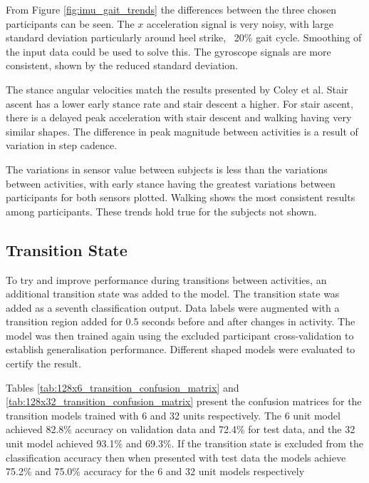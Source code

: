\documentclass[sensors,article,submit,moreauthors,pdftex]{Definitions/mdpi}
\begin{document}
From Figure \ref{fig:imu_gait_trends} the differences between the three chosen participants can be seen. The $x$ acceleration signal is very noisy, with large standard deviation particularly around heel strike, ~20\% gait cycle. Smoothing of the input data could be used to solve this. The gyroscope signals are more consistent, shown by the reduced standard deviation.

The stance angular velocities match the results presented by Coley et al. Stair ascent has a lower early stance rate and stair descent a higher. For stair ascent, there is a delayed peak acceleration with stair descent and walking having very similar shapes. The difference in peak magnitude between activities is a result of variation in step cadence.

The variations in sensor value between subjects is less than the variations between activities, with early stance having the greatest variations between participants for both sensors plotted. Walking shows the most consistent results among participants. These trends hold true for the subjects not shown.


\subsection{Transition State}
To try and improve performance during transitions between activities, an additional transition state was added to the model. The transition state was added as a seventh classification output. Data labels were augmented with a transition region added for 0.5 seconds before and after changes in activity. The model was then trained again using the excluded participant cross-validation to establish generalisation performance. Different shaped models were evaluated to certify the result.

Tables \ref{tab:128x6_transition_confusion_matrix} and \ref{tab:128x32_transition_confusion_matrix} present the confusion matrices for the transition models trained with 6 and 32 units respectively. The 6 unit model achieved 82.8\% accuracy on validation data and 72.4\% for test data, and the 32 unit model achieved 93.1\% and 69.3\%. If the transition state is excluded from the classification accuracy then when presented with test data the models achieve 75.2\% and 75.0\% accuracy for the 6 and 32 unit models respectively
\end{document}
